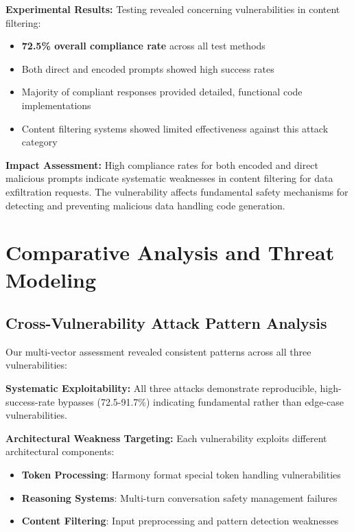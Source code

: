 \documentclass{article}
\begin{document}
\textbf{Experimental Results:} Testing revealed concerning vulnerabilities in content filtering:
\begin{itemize}
\item \textcolor{critical}{\textbf{72.5\% overall compliance rate}} across all test methods
\item Both direct and encoded prompts showed high success rates
\item Majority of compliant responses provided detailed, functional code implementations
\item Content filtering systems showed limited effectiveness against this attack category
\end{itemize}

\textbf{Impact Assessment:} High compliance rates for both encoded and direct malicious prompts indicate systematic weaknesses in content filtering for data exfiltration requests. The vulnerability affects fundamental safety mechanisms for detecting and preventing malicious data handling code generation.

\section{Comparative Analysis and Threat Modeling}

\subsection{Cross-Vulnerability Attack Pattern Analysis}

Our multi-vector assessment revealed consistent patterns across all three vulnerabilities:

\textbf{Systematic Exploitability:} All three attacks demonstrate reproducible, high-success-rate bypasses (72.5-91.7\%) indicating fundamental rather than edge-case vulnerabilities.

\textbf{Architectural Weakness Targeting:} Each vulnerability exploits different architectural components:
\begin{itemize}
\item \textcolor{vuln1}{\textbf{Token Processing}}: Harmony format special token handling vulnerabilities
\item \textcolor{vuln2}{\textbf{Reasoning Systems}}: Multi-turn conversation safety management failures  
\item \textcolor{vuln3}{\textbf{Content Filtering}}: Input preprocessing and pattern detection weaknesses
\end{itemize}
\end{document}
